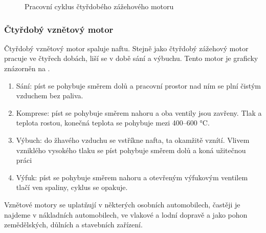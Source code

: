 \begin{figure}[H]
    
    \caption{Pracovní cyklus čtyřdobého zážehového motoru \jaDiag}
    \label{obr:PracovniCyklusCtyrdobehoZazehovehoMotoru}
\end{figure}

\newpage

\subsubsection{Čtyřdobý vznětový motor}
{Čtyřdobý vznětový motor spaluje naftu. Stejně jako čtyřdobý zážehový motor pracuje ve čtyřech dobách, liší se v době sání a výbuchu. Tento motor je graficky znázorněn na .}
\cite{CVUT:NávrhKonstrukceVznetovehoMotoru}
\begin{enumerate}
    \item {Sání: píst se pohybuje směrem dolů a pracovní prostor nad ním se plní čistým vzduchem bez paliva.}
    \item {Komprese: píst se pohybuje směrem nahoru a oba ventily jsou zavřeny. Tlak a teplota rostou, konečná teplota se pohybuje mezi 400--600 °C.}
    \item {Výbuch: do žhavého vzduchu se vstříkne nafta, ta okamžitě vznítí. Vlivem vzniklého vysokého tlaku se píst pohybuje směrem dolů a koná užitečnou práci}
    \item {Výfuk: píst se pohybuje směrem nahoru a otevřeným výfukovým ventilem tlačí ven spaliny, cyklus se opakuje.}
\end{enumerate}
{Vznětové motory se uplatňují v některých osobních automobilech, častěji je najdeme v nákladních automobilech, ve vlakové a lodní dopravě a jako pohon zemědělských, důlních a stavebních zařízení.}
\cite{CVUT:NávrhKonstrukceVznetovehoMotoru}

